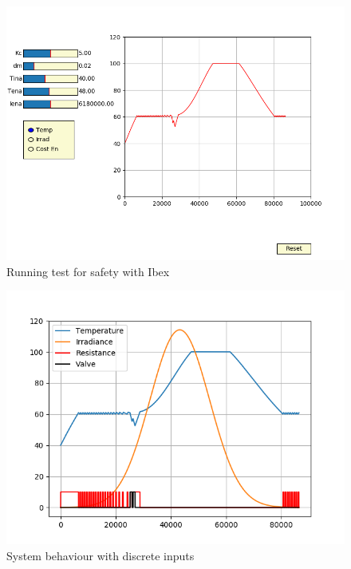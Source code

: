 \documentclass[a4paper,12pt]{book}
\begin{document}
    \begin{figure}
        \includegraphics[width=\linewidth]{8.png}
        \caption{Running test for safety with Ibex}
        \label{fig:1}
    \end{figure}
   
    \begin{figure}
        \includegraphics[width=\linewidth]{9.png}
        \caption{System behaviour with discrete inputs}
        \label{fig:1}
    \end{figure}
\end{document}

